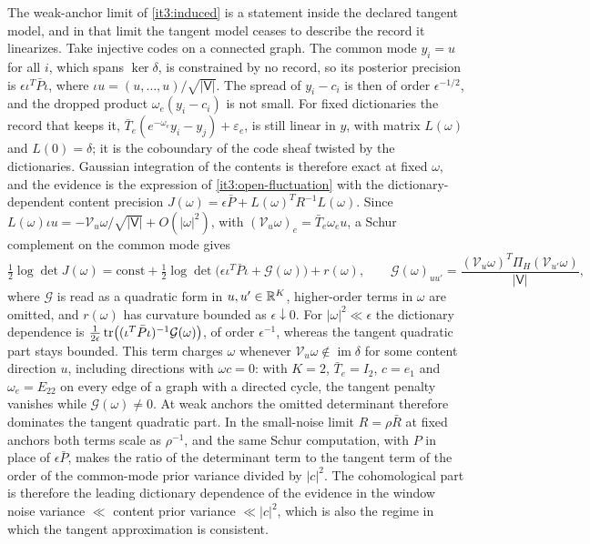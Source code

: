 The weak-anchor limit of \cref{it3:induced} is a statement inside the declared tangent model, and in that limit the tangent model ceases to describe the record it linearizes. Take injective codes on a connected graph. The common mode $y_i=u$ for all $i$, which spans $\ker\delta$, is constrained by no record, so its posterior precision is $\epsilon\iota^T\bar P\iota$, where $\iota u=(u,\ldots,u)/\sqrt{|\mathsf V|}$. The spread of $y_i-c_i$ is then of order $\epsilon^{-1/2}$, and the dropped product $\omega_e(y_i-c_i)$ is not small. For fixed dictionaries the record that keeps it, $\bar T_e(e^{-\omega_e}y_i-y_j)+\varepsilon_e$, is still linear in $y$, with matrix $L(\omega)$ and $L(0)=\delta$; it is the coboundary of the code sheaf twisted by the dictionaries. Gaussian integration of the contents is therefore exact at fixed $\omega$, and the evidence is the expression of \cref{it3:open-fluctuation} with the dictionary-dependent content precision $J(\omega)=\epsilon\bar P+L(\omega)^TR^{-1}L(\omega)$. Since $L(\omega)\iota u=-\mathcal V_u\omega/\sqrt{|\mathsf V|}+O(|\omega|^2)$, with $(\mathcal V_u\omega)_e=\bar T_e\omega_eu$, a Schur complement on the common mode gives
\begin{equation}
\tfrac12\log\det J(\omega)=\mathrm{const}+\tfrac12\log\det\bigl(\epsilon\iota^T\bar P\iota+\mathcal G(\omega)\bigr)+r(\omega),\qquad
\mathcal G(\omega)_{uu'}=\frac{(\mathcal V_u\omega)^T\Pi_H(\mathcal V_{u'}\omega)}{|\mathsf V|},
\label{it3:determinant-crossover}
\end{equation}
where $\mathcal G$ is read as a quadratic form in $u,u'\in\mathbb R^K$, higher-order terms in $\omega$ are omitted, and $r(\omega)$ has curvature bounded as $\epsilon\downarrow0$. For $|\omega|^2\ll\epsilon$ the dictionary dependence is $\frac1{2\epsilon}\operatorname{tr}\bigl((\iota^T\bar P\iota)^{-1}\mathcal G(\omega)\bigr)$, of order $\epsilon^{-1}$, whereas the tangent quadratic part stays bounded. This term charges $\omega$ whenever $\mathcal V_u\omega\notin\operatorname{im}\delta$ for some content direction $u$, including directions with $\omega c=0$: with $K=2$, $\bar T_e=I_2$, $c=e_1$ and $\omega_e=E_{22}$ on every edge of a graph with a directed cycle, the tangent penalty vanishes while $\mathcal G(\omega)\neq0$. At weak anchors the omitted determinant therefore dominates the tangent quadratic part. In the small-noise limit $R=\rho\bar R$ at fixed anchors both terms scale as $\rho^{-1}$, and the same Schur computation, with $P$ in place of $\epsilon\bar P$, makes the ratio of the determinant term to the tangent term of the order of the common-mode prior variance divided by $|c|^2$. The cohomological part is therefore the leading dictionary dependence of the evidence in the window noise variance $\ll$ content prior variance $\ll|c|^2$, which is also the regime in which the tangent approximation is consistent.

